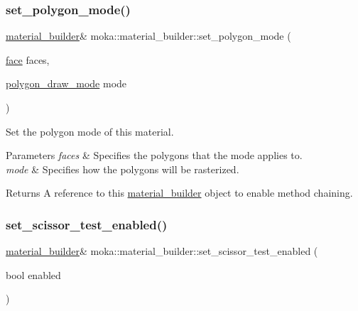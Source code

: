 \subsubsection{\texorpdfstring{set\_polygon\_mode()}{set\_polygon\_mode()}}
{\footnotesize\ttfamily \mbox{\hyperlink{classmoka_1_1material__builder}{material\+\_\+builder}}\& moka\+::material\+\_\+builder\+::set\+\_\+polygon\+\_\+mode (\begin{DoxyParamCaption}\item[{\mbox{\hyperlink{namespacemoka_a262acd665924ba4041f64f7207b17cbe}{face}}}]{faces,  }\item[{\mbox{\hyperlink{namespacemoka_ab11ab0363880d78783c5e5b4d5c28a8b}{polygon\+\_\+draw\+\_\+mode}}}]{mode }\end{DoxyParamCaption})}



Set the polygon mode of this material. 


\begin{DoxyParams}{Parameters}
{\em faces} & Specifies the polygons that the mode applies to. \\
\hline
{\em mode} & Specifies how the polygons will be rasterized. \\
\hline
\end{DoxyParams}
\begin{DoxyReturn}{Returns}
A reference to this \mbox{\hyperlink{classmoka_1_1material__builder}{material\+\_\+builder}} object to enable method chaining. 
\end{DoxyReturn}
\mbox{\label{classmoka_1_1material__builder_ac69e714a4d4a2da70c057b5470ccf6cb}} 
\subsubsection{\texorpdfstring{set\_scissor\_test\_enabled()}{set\_scissor\_test\_enabled()}}
{\footnotesize\ttfamily \mbox{\hyperlink{classmoka_1_1material__builder}{material\+\_\+builder}}\& moka\+::material\+\_\+builder\+::set\+\_\+scissor\+\_\+test\+\_\+enabled (\begin{DoxyParamCaption}\item[{bool}]{enabled }\end{DoxyParamCaption})}



